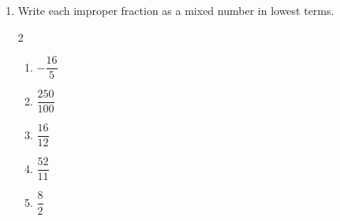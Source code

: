\documentclass[12pt]{article}
\begin{document}
\begin{enumerate}
\begin{multicols}{2}
\begin{enumerate}
    \item \hspace{0.50in} $3\dfrac{5}{8}$
  \vspace{0.25in}

    \item \hspace{0.50in} $1\dfrac{2}{3}$
  \vspace{0.25in}

    \item \hspace{0.50in} $2\dfrac{1}{2}$
  \vspace{0.25in}

    \item \hspace{0.50in} $5\dfrac{2}{3}$
  \vspace{0.25in}

    \item \hspace{0.50in} $2\dfrac{9}{32}$
  \vspace{0.25in}

\end{enumerate}
\end{multicols}

  \vspace{0.5in}

\item Write each improper fraction as a mixed number in lowest terms.
\begin{multicols}{2}
\begin{enumerate}

\item \hspace{0.5in} $-\dfrac{16}{5}$
  \vspace{0.25in}

\item \hspace{0.5in} $\dfrac{250}{100}$
  \vspace{0.25in}

\item \hspace{0.5in} $\dfrac{16}{12}$
  \vspace{0.25in}

\item \hspace{0.5in} $\dfrac{52}{11}$
  \vspace{0.25in}

\item \hspace{0.5in} $\dfrac{8}{2}$
  \vspace{0.25in}


\end{enumerate}
\end{multicols}
\end{enumerate}
\end{document}
